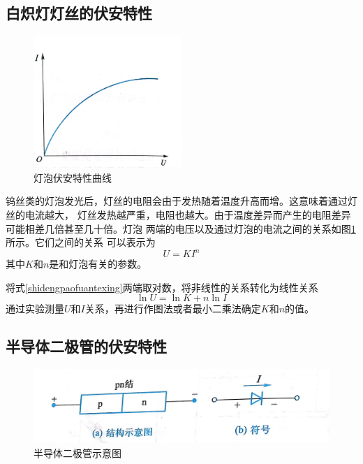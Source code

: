 \documentclass{ctexart}
\begin{document}
  \subsection{白炽灯灯丝的伏安特性}
  \begin{figure}[t]
    \centering
    \includegraphics[width=0.5\textwidth,height=0.3\textheight]{dengpaofuantexing.jpg}
    \caption{灯泡伏安特性曲线}\label{dengpaofuantexing}
  \end{figure}
  钨丝类的灯泡发光后，灯丝的电阻会由于发热随着温度升高而增。这意味着通过灯丝的电流越大，
  灯丝发热越严重，电阻也越大。由于温度差异而产生的电阻差异可能相差几倍甚至几十倍。灯泡
  两端的电压以及通过灯泡的电流之间的关系如图\ref{dengpaofuantexing}所示。它们之间的关系
  可以表示为
  \begin{equation}\label{shidengpaofuantexing}
    U=KI^{n}
  \end{equation}
  其中$K$和$n$是和灯泡有关的参数。

  将式\ref{shidengpaofuantexing}两端取对数，将非线性的关系转化为线性关系
  \begin{equation}
    \ln U=\ln K+n\ln I
  \end{equation}
  通过实验测量$U$和$I$关系，再进行作图法或者最小二乘法确定$K$和$n$的值。

  \subsection{半导体二极管的伏安特性}
  \begin{figure}[t]
    \centering
    \includegraphics[width=1\textwidth,height=0.3\textheight]{bandaoti.jpg}
    \caption{半导体二极管示意图}\label{bandaoti}
  \end{figure}
\end{document}
